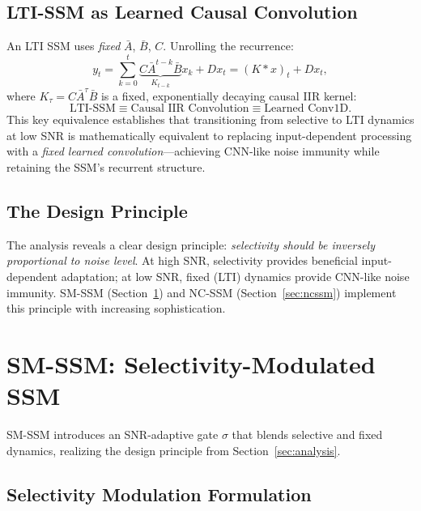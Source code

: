 \documentclass[journal]{IEEEtran}
\begin{document}
\subsection{LTI-SSM as Learned Causal Convolution}
\label{sec:lti_equiv}

An LTI SSM uses \emph{fixed} $\bar{A}$, $\bar{B}$, $C$. Unrolling the recurrence:
\begin{equation}
y_t = \sum_{k=0}^{t} \underbrace{C \bar{A}^{t-k} \bar{B}}_{K_{t-k}} x_k + D x_t = (K \ast x)_t + D x_t,
\label{eq:conv}
\end{equation}
where $K_\tau = C \bar{A}^\tau \bar{B}$ is a fixed, exponentially decaying causal IIR kernel:
\begin{equation}
\boxed{\text{LTI-SSM} \equiv \text{Causal IIR Convolution} \equiv \text{Learned Conv1D}.}
\label{eq:equivalence}
\end{equation}
This key equivalence establishes that transitioning from selective to LTI dynamics at low SNR is mathematically equivalent to replacing input-dependent processing with a \emph{fixed learned convolution}---achieving CNN-like noise immunity while retaining the SSM's recurrent structure.

\subsection{The Design Principle}

The analysis reveals a clear design principle: \emph{selectivity should be inversely proportional to noise level}.
At high SNR, selectivity provides beneficial input-dependent adaptation; at low SNR, fixed (LTI) dynamics provide CNN-like noise immunity.
SM-SSM (Section~\ref{sec:smssm}) and NC-SSM (Section~\ref{sec:ncssm}) implement this principle with increasing sophistication.


\section{SM-SSM: Selectivity-Modulated SSM}
\label{sec:smssm}

SM-SSM introduces an SNR-adaptive gate $\sigma$ that blends selective and fixed dynamics, realizing the design principle from Section~\ref{sec:analysis}.

\subsection{Selectivity Modulation Formulation}
\end{document}
